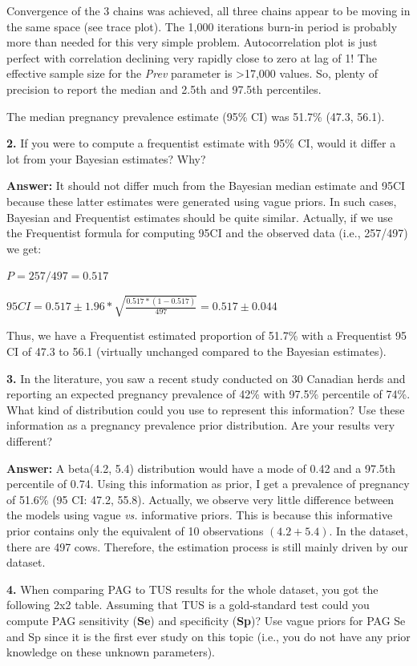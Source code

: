 \documentclass[
]{book}
\begin{document}
Convergence of the 3 chains was achieved, all three chains appear to be
moving in the same space (see trace plot). The 1,000 iterations burn-in
period is probably more than needed for this very simple problem.
Autocorrelation plot is just perfect with correlation declining very
rapidly close to zero at lag of 1! The effective sample size for the
\emph{Prev} parameter is \textgreater17,000 values. So, plenty of
precision to report the median and 2.5th and 97.5th percentiles.

The median pregnancy prevalence estimate (95\% CI) was 51.7\% (47.3,
56.1).

\textbf{2.} If you were to compute a frequentist estimate with 95\% CI,
would it differ a lot from your Bayesian estimates? Why?

\textbf{Answer:} It should not differ much from the Bayesian median
estimate and 95CI because these latter estimates were generated using
vague priors. In such cases, Bayesian and Frequentist estimates should
be quite similar. Actually, if we use the Frequentist formula for
computing 95CI and the observed data (i.e., 257/497) we get:

\(P = 257/497 = 0.517\)

\(95CI=0.517 \pm 1.96* \sqrt{\frac{0.517*(1-0.517)}{497}} = 0.517 \pm 0.044\)

Thus, we have a Frequentist estimated proportion of 51.7\% with a
Frequentist 95 CI of 47.3 to 56.1 (virtually unchanged compared to the
Bayesian estimates).

\textbf{3.} In the literature, you saw a recent study conducted on 30
Canadian herds and reporting an expected pregnancy prevalence of 42\%
with 97.5\% percentile of 74\%. What kind of distribution could you use
to represent this information? Use these information as a pregnancy
prevalence prior distribution. Are your results very different?

\textbf{Answer:} A beta(4.2, 5.4) distribution would have a mode of 0.42
and a 97.5th percentile of 0.74. Using this information as prior, I get
a prevalence of pregnancy of 51.6\% (95 CI: 47.2, 55.8). Actually, we
observe very little difference between the models using vague \emph{vs.}
informative priors. This is because this informative prior contains only
the equivalent of 10 observations \((4.2+5.4)\). In the dataset, there
are 497 cows. Therefore, the estimation process is still mainly driven
by our dataset.

\textbf{4.} When comparing PAG to TUS results for the whole dataset, you
got the following 2x2 table. Assuming that TUS is a gold-standard test
could you compute PAG sensitivity (\textbf{Se}) and specificity
(\textbf{Sp})? Use vague priors for PAG Se and Sp since it is the first
ever study on this topic (i.e., you do not have any prior knowledge on
these unknown parameters).
\end{document}
